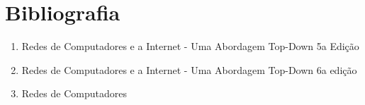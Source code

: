 \documentclass{article}
\begin{document}
\section{Bibliografia}
\begin{enumerate}
    \item Redes de Computadores e a Internet - Uma Abordagem Top-Down 5a Edição\cite{redeseinternet5}
    \item Redes de Computadores e a Internet - Uma Abordagem Top-Down 6a edição\cite{redeseinternet6}
    \item Redes de Computadores\cite{redesedecomputadores}
\end{enumerate}






\end{document}
